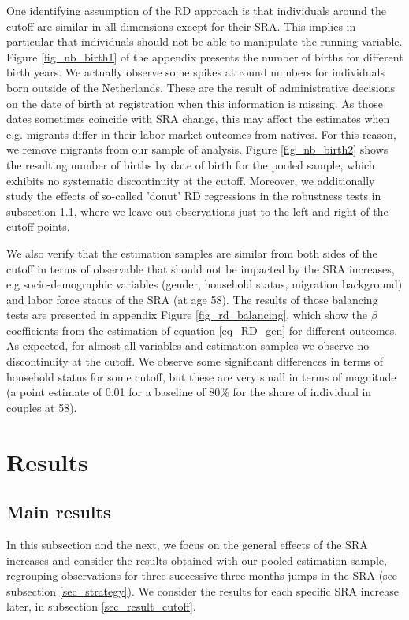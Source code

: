 \documentclass[12pt,a4paper]{article}
\begin{document}
One identifying assumption of the RD approach is that individuals around the cutoff are similar in all dimensions except for their SRA. This implies in particular that individuals should not be able to manipulate the running variable. Figure \ref{fig_nb_birth1} of the appendix presents the number of births for different birth years. We actually observe some spikes at round numbers for individuals born outside of the Netherlands. These are the result of administrative decisions on the date of birth at registration when this information is missing. As those dates sometimes coincide with SRA change, this may affect the estimates when e.g. migrants differ in their labor market outcomes from natives. For this reason, we remove migrants from our sample of analysis. Figure \ref{fig_nb_birth2} shows the resulting number of births by date of birth for the pooled sample, which exhibits no systematic discontinuity at the cutoff. Moreover, we additionally study the effects of so-called 'donut' RD regressions in the robustness tests in subsection \ref{sec_result_main}, where we leave out observations just to the left and right of the cutoff points.

We also verify that the estimation samples are similar from both sides of the cutoff in terms of observable that should not be impacted by the SRA increases, e.g socio-demographic variables (gender, household status, migration background) and labor force status of the SRA (at age 58). The results of those balancing tests are presented in appendix Figure \ref{fig_rd_balancing}, which show the $\beta$ coefficients from the estimation of equation \ref{eq_RD_gen} for different outcomes. As expected, for almost all variables and estimation samples we observe no discontinuity at the cutoff. We observe some significant differences in terms of household status for some cutoff, but these are very small in terms of magnitude (a point estimate of 0.01 for a baseline of 80\% for the share of individual in couples at 58). 

\section{Results}

\subsection{Main results}\label{sec_result_main}

In this subsection and the next, we focus on the general effects of the SRA increases and consider the results obtained with our pooled estimation sample, regrouping observations for three successive three months jumps in the SRA (see subsection \ref{sec_strategy}). We consider the results for each specific SRA increase later, in subsection \ref{sec_result_cutoff}.
\end{document}
